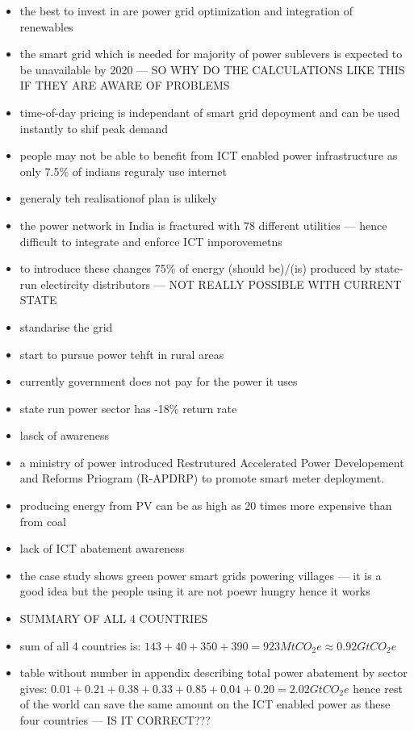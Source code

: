 \documentclass[11pt, twocolumn]{article}
\begin{document}
\begin{itemize}
\item the best to invest in are power grid optimization and integration of renewables
\item the smart grid which is needed for majority of power sublevers is expected to be unavailable by 2020 --- SO WHY DO THE CALCULATIONS LIKE THIS IF THEY ARE AWARE OF PROBLEMS
\item time-of-day pricing is independant of smart grid depoyment and can be used instantly to shif peak demand
\item people may not be able to benefit from ICT enabled power infrastructure as only 7.5\% of indians reguraly use internet
\item generaly teh realisationof plan is ulikely
\item the power network in India is fractured with 78 different utilities --- hence difficult to integrate and enforce ICT imporovemetns
\item to introduce these changes 75\% of energy (should be)/(is) produced by state-run electircity distributors --- NOT REALLY POSSIBLE WITH CURRENT STATE
\item standarise the grid
\item start to pursue power tehft in rural areas
\item currently government does not pay for the power it uses
\item state run power sector has -18\% return rate
\item lasck of awareness
\item a ministry of power introduced Restrutured Accelerated Power Developement and Reforms Priogram (R-APDRP) to promote smart meter deployment.
\item producing energy from PV can be as high as 20 times more expensive than from coal
\item lack of ICT abatement awareness
\item the case study shows green power smart grids powering villages --- it is a good idea but the people using it are not poewr hungry hence it works

\item SUMMARY OF ALL 4 COUNTRIES
\item sum of all 4 countries is: $143+40+350+390=923MtCO_2e \approx 0.92 GtCO_2e$
\item table without number in appendix describing total power abatement by sector gives: $0.01+0.21+0.38+0.33+0.85+0.04+0.20 = 2.02 GtCO_2e$ hence rest of the world can save the same amount on the ICT enabled power as these four countries --- IS IT CORRECT???

\end{itemize}
\end{document}
